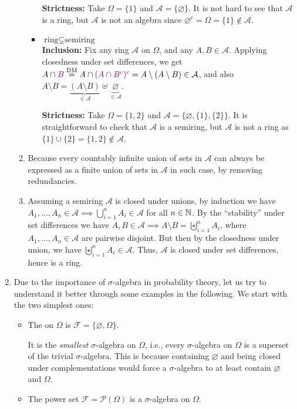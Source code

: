 \begin{enumerate}
\begin{pf}
\begin{enumerate}
\begin{itemize}
\textbf{Strictness:} Take \(\Omega=\{1\}\) and \(\mathcal{A}=\{\varnothing\}\).
It is not hard to see that \(\mathcal{A}\) is a ring, but \(\mathcal{A}\) is
not an algebra since \(\varnothing^c=\Omega=\{1\}\notin \mathcal{A}\).

\item \underline{\(\text{ring}\subsetneq\text{semiring}\)} \\
\textbf{Inclusion:} Fix any ring \(\mathcal{A}\) on \(\Omega\), and any \(A,B\in\mathcal{A}\).
Applying closedness under set differences, we get
\(A\cap \vc{B}\overset{\text{DM}}{=}A\cap\vc{(A\cap B^c)^c}
=A\setminus (A\setminus B)\in \mathcal{A}\), and also
\(A\setminus B=\underbrace{(A\setminus B)}_{\in\mathcal{A}}\uplus\underbrace{\varnothing}_{\in \mathcal{A}}\).

\textbf{Strictness:} Take \(\Omega=\{1,2\}\) and \(\mathcal{A}=\{\varnothing,\{1\},\{2\}\}\).
It is straightforward to check that \(\mathcal{A}\) is a semiring, but
\(\mathcal{A}\) is not a ring as \(\{1\}\cup\{2\}=\{1,2\}\notin\mathcal{A}\).
\end{itemize}
\item Because every countably infinite union of sets in \(\mathcal{A}\) can
always be expressed as a finite union of sets in \(\mathcal{A}\) in such case,
by removing redundancies.
\item Assuming a semiring \(\mathcal{A}\) is closed under unions, by induction
we have \(A_1,\dotsc,A_n\in\mathcal{A}\implies
\bigcup_{i=1}^{n}A_i\in\mathcal{A}\) for all \(n\in\mathbb{N}\). By the
``stability'' under set differences we have \(A,B\in\mathcal{A}\implies
A\setminus B=\biguplus_{i=1}^{n}A_i\), where \(A_1,\dotsc,A_n\in\mathcal{A}\)
are pairwise disjoint. But then by the closedness under union, we have
\(\biguplus_{i=1}^{n}A_i\in\mathcal{A}\). Thus, \(\mathcal{A}\) is closed under
set differences, hence is a ring.
\end{enumerate}
\end{pf}
\item Due to the importance of \(\sigma\)-algebra in probability theory, let us
try to understand it better through some examples in the following.
We start with the two simplest ones:
\begin{itemize}
\item The  on \(\Omega\) is
\(\mathcal{F}=\{\varnothing,\Omega\}\).
\begin{note}
It is the \emph{smallest} \(\sigma\)-algebra on \(\Omega\), i.e., every
\(\sigma\)-algebra on \(\Omega\) is a superset of the trivial
\(\sigma\)-algebra.  This is because containing \(\varnothing\) and being
closed under complementations would force a \(\sigma\)-algebra to at least
contain \(\varnothing\) and \(\Omega\).
\end{note}
\item The power set \(\mathcal{F}=\mathcal{P}(\Omega)\) is a \(\sigma\)-algebra
on \(\Omega\).


\end{itemize}
\end{enumerate}
